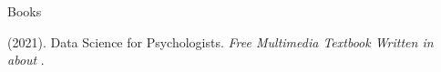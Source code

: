 

\begin{rSection}{\textrm{Books}}%
\begin{etaremune}
\item  \meb (2021). Data Science for Psychologists. \textit{Free Multimedia Textbook Written in \R about \R}. 

\end{etaremune}\end{rSection}%
